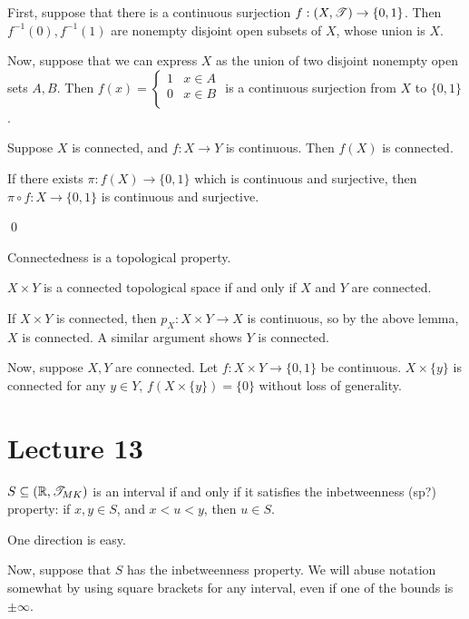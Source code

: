 \documentclass[x11names,reqno,14pt]{extarticle}
\newcommand*{\oo}{{\infty}}
\begin{document}
\proof

First, suppose that there is a continuous surjection $f:(X,\mathscr{T})\to\{0, 1\}$. Then $f^{-1}(0), f^{-1}(1)$ are nonempty disjoint open subsets of $X$, whose union is $X$. 

Now, suppose that we can express $X$ as the union of two disjoint nonempty open sets $A, B$. Then $f(x) = \begin{cases} 1 & x \in A \\ 0 & x \in B \\ \end{cases}$ is a continuous surjection from $X$ to $\{0,1\}$. 

\lem

Suppose $X$ is connected, and $f:X\to Y$ is continuous. Then $f(X)$ is connected.

\proof

If there exists $\pi:f(X)\to\{0, 1\}$ which is continuous and surjective, then $\pi \circ f :X\to\{0, 1\}$ is continuous and surjective. 

\qed

\cor

Connectedness is a topological property. 

\thm

$X \times Y$ is a connected topological space if and only if $X$ and $Y$ are connected. 

\proof

If $X \times Y$ is connected, then $p_X:X\times Y \to X$ is continuous, so by the above lemma, $X$ is connected. A similar argument shows $Y$ is connected. 

Now, suppose $X, Y$ are connected. Let $f:X\times Y\to\{0,1\}$ be continuous. $X\times\{y\}$ is connected for any $y \in Y$, $f(X\times\{y\}) = \{0\}$ without loss of generality. 

\section*{Lecture 13}

\lem

$S \subseteq (\mathbb{R}, \mathscr{T}_{MK})$ is an interval if and only if it satisfies the inbetweenness (sp?) property: if $x, y \in S$, and $x < u < y$, then $u \in S$. 

\proof

One direction is easy.

Now, suppose that $S$ has the inbetweenness property. We will abuse notation somewhat by using square brackets for any interval, even if one of the bounds is $\pm\oo$. 
\end{document}
